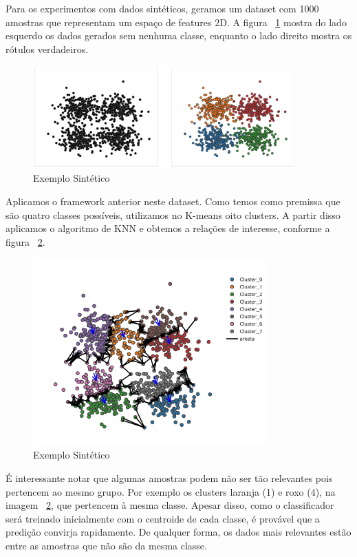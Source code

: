 Para os experimentos com dados sintéticos, geramos um dataset com 1000 amostras que representam um espaço de features 2D. A figura ~\ref{fig:exemplo_sintetico_1} mostra do lado esquerdo os dados gerados sem nenhuma classe, enquanto o lado direito mostra os rótulos verdadeiros. 


\begin{figure}
  \centering
  \includegraphics[width=0.9\textwidth]{figures/toy_example_1.png}
  \caption{Exemplo Sintético}
  \label{fig:exemplo_sintetico_1}
\end{figure}

Aplicamos o framework anterior neste dataset. Como temos como premissa que são quatro classes possíveis, utilizamos no K-means oito clusters. A partir disso aplicamos o algoritmo de KNN e obtemos a relações de interesse, conforme a figura ~\ref{fig:exemplo_sintetico_2}. 

\begin{figure}
  \centering
  \includegraphics[width=0.8\textwidth]{figures/toy_example_2.png}
  \caption{Exemplo Sintético}
  \label{fig:exemplo_sintetico_2}
\end{figure}

É interessante notar que algumas amostras podem não ser tão relevantes pois pertencem ao mesmo grupo. Por exemplo os clusters laranja (1) e roxo (4), na imagem ~\ref{fig:exemplo_sintetico_2}, que pertencem à mesma classe. Apesar disso, como o classificador será treinado inicialmente com o centroide de cada classe, é provável que a predição convirja rapidamente. De qualquer forma, os dados mais relevantes estão entre as amostras que não são da mesma classe. 


